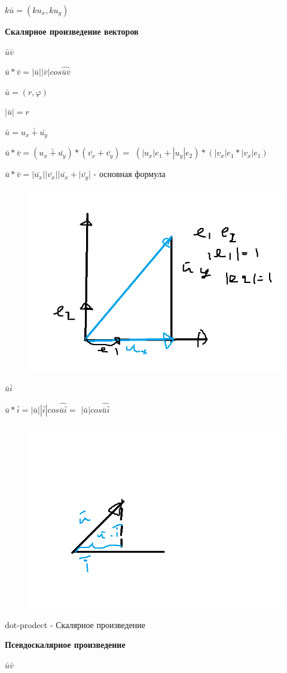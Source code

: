\documentclass{article}
\begin{document}
$k\bar{u} = (ku_x,ku_y)$


\textbf{Скалярное произведение векторов}

$\bar{u}  \bar{v}$

$\bar{u} * \bar{v} = |\bar{u}| |\bar{v}| cos \widehat{\bar{u} \bar{v}} $

$\bar{u} = (r,\varphi)$

$|\bar{u}| = r$

$\bar{u} = \bar{u_x+\bar{u_y}}$

$\bar{u} * \bar{v} = (\bar{u_x+\bar{u_y}})*(\bar{v_x} + \bar{v_y})= $
$(|u_x|e_1 + |u_y|e_2) *(|v_x|e_1 *|v_x|e_1)$


$\bar{u}*\bar{v} = |\bar{u_x}||\bar{v_x}||\bar{u_x}+|\bar{v_y}| $ - основная формула
\begin{figure} [H]
    \includegraphics[width=0.50\linewidth]{9.png}
\end{figure}


$\bar{u} \bar{i}$

$\bar{u}*\bar{i} = |\bar{u}| |\bar{i}| cos \widehat{\bar{u} \bar{i}} =$
$|\bar{u}| cos\widehat{\bar{u} \bar{i}}$




\begin{figure} [H]
    \includegraphics[width=0.50\linewidth]{10.png}
\end{figure}


dot-prodect - Скалярное произведение

\textbf{Псевдоскалярное произведение}

$\bar{u} \bar{v}$
\end{document}
